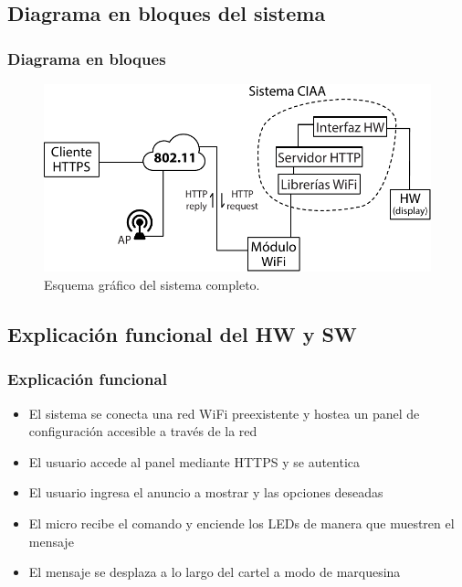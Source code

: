 \subsection{Diagrama en bloques del sistema}
\begin{frame}
	\frametitle{Diagrama en bloques}
	\begin{figure}[htbp]
		\begin{center}
			\includegraphics[width=\textwidth]{diagramas/diagrama-bloques-2.pdf}
			\caption{Esquema gráfico del sistema completo.}
			\label{fig:diagrama-bloques}
		\end{center}
	\end{figure}
\end{frame}

\subsection{Explicación funcional del HW y SW}
\begin{frame}
	\frametitle{Explicación funcional}
	\begin{itemize}
		 \item El sistema se conecta una red WiFi preexistente y hostea un panel de configuración accesible a través de la red
		 \item El usuario accede al  panel mediante HTTPS y se autentica
		 \item El usuario ingresa el anuncio a mostrar y las opciones deseadas
		 \item El micro recibe el comando y enciende los LEDs de manera que muestren el mensaje
		 \item El mensaje se desplaza a lo largo del cartel a modo de marquesina
	\end{itemize}
	

\end{frame}

